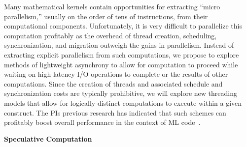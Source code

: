\documentclass[12pt]{article}
\begin{document}
Many mathematical kernels contain opportunities for extracting ``micro parallelism,''
usually on the order of tens of instructions, from their computational components. 
Unfortunately, it is very difficult to parallelize this computation profitably as
the overhead of thread creation, scheduling, synchronization, and migration outweigh
the gains in parallelism. Instead of extracting explicit parallelism from such
computations, we propose to explore methods of lightweight asynchrony to allow for
computation to proceed while waiting on high latency I/O operations to complete or
the results of other computations. Since the creation of threads and associated
schedule and synchronization costs are typically prohibitive, we will explore new
threading models that allow for logically-distinct computations to execute within
a given construct. The PIs previous research has indicated that such schemes can profitably
boost overall performance in the context of ML code~\cite{acml, parasites}. 

\bigskip
\noindent
{\bf Speculative Computation}
\bigskip
\end{document}
